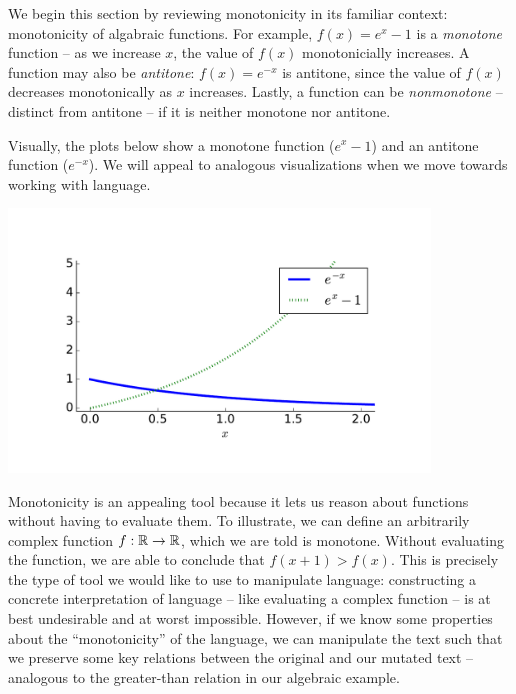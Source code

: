 
%
%
We begin this section by reviewing monotonicity in its familiar context:
  monotonicity of algabraic functions.
For example, $f(x) = e^x - 1$ is a \textit{monotone} function -- as we increase $x$,
  the value of $f(x)$ monotonicially increases.
A function may also be \textit{antitone}: $f(x) = e^{-x}$ is antitone, since 
  the value of $f(x)$ decreases monotonically as $x$ increases.
Lastly, a function can be \textit{nonmonotone} -- distinct from antitone -- if
  it is neither monotone nor antitone.

Visually, the plots below show a monotone function ($e^x - 1$) and an antitone 
  function ($e^{-x}$).
We will appeal to analogous visualizations when we move towards working with
  language.

\begin{center}
\includegraphics[height=7cm]{img/monotonicity_math.pdf}
\end{center}


Monotonicity is an appealing tool because it lets us reason about functions
  without having to evaluate them.
To illustrate, we can define an arbitrarily complex function $f : \mathbb{R} \rightarrow \mathbb{R}$,
  which we are told is monotone.
Without evaluating the function, we are able to conclude that
  $f(x + 1) > f(x)$.
This is precisely the type of tool we would like to use to manipulate language:
  constructing a concrete interpretation of language -- like evaluating 
  a complex function -- is at best undesirable and at worst impossible.
However, if we know some properties about the ``monotonicity'' of the language,
  we can manipulate the text such that we preserve some key relations
  between the original and our mutated text -- analogous to the greater-than
  relation in our algebraic example.

